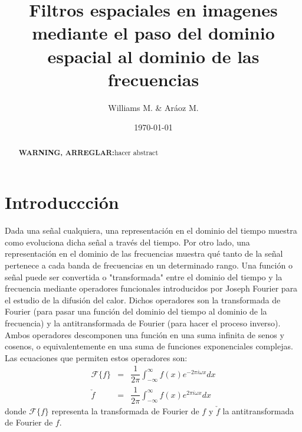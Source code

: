 \documentclass[11pt,a4paper]{emulateapj}
\def \warn {{\sffamily\bfseries\large WARNING, ARREGLAR:}}
\begin{document}
\title{Filtros espaciales en imagenes mediante el paso del dominio espacial al dominio de las frecuencias}
\author{Williams M. \& Aráoz M.}
\date{\today}


\begin{abstract}
\warn{hacer abstract}
\end{abstract}

\maketitle




\section{Introduccción}
\label{sec:introduccion}






Dada una señal cualquiera, una representación en el dominio del tiempo muestra como evoluciona dicha señal
a través del tiempo. Por otro lado, una representación en el dominio de las frecuencias muestra qué tanto de 
la señal pertenece a cada banda de frecuencias en un determinado rango. \citet*{wiki10} Una función o señal puede ser convertida
o "transformada" entre el dominio del tiempo y la frecuencia mediante operadores funcionales introducidos por 
Joseph Fourier para el estudio de la difusión del calor. Dichos operadores son la transformada de Fourier (para
pasar una función del dominio del tiempo al dominio de la frecuencia) y la antitransformada de Fourier (para hacer
el proceso inverso). Ambos operadores descomponen una función en una suma infinita de senos y cosenos, o equivalentemente
en una suma de funciones exponenciales complejas. \\

Las ecuaciones que permiten estos operadores son: \\
\begin{eqnarray}
\mathcal{F}\{f\} &=& \dfrac{1}{2\pi} \int_{-\infty}^{\infty} f(x)e^{-2\pi i \omega x} dx  \\
\check{f} &=& \dfrac{1}{2\pi} \int_{-\infty}^{\infty} f(x)e^{2\pi i \omega x} dx
\end{eqnarray}
donde $\mathcal{F}\{f\} $ representa la transformada de Fourier de $f$ y $\check{f}$ la antitransformada de Fourier de $f$.
\citet*{wolf10}\\
\end{document}
